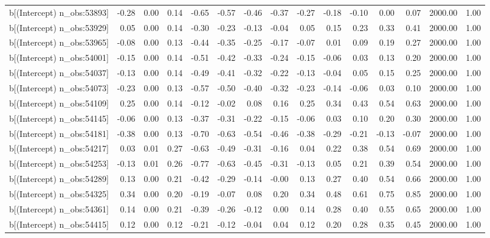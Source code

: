 \begin{table}[ht]
\begin{tabular}{rrrrrrrrrrrrrrr}
  b[(Intercept) n\_obs:53893] & -0.28 & 0.00 & 0.14 & -0.65 & -0.57 & -0.46 & -0.37 & -0.27 & -0.18 & -0.10 & 0.00 & 0.07 & 2000.00 & 1.00 \\ 
  b[(Intercept) n\_obs:53929] & 0.05 & 0.00 & 0.14 & -0.30 & -0.23 & -0.13 & -0.04 & 0.05 & 0.15 & 0.23 & 0.33 & 0.41 & 2000.00 & 1.00 \\ 
  b[(Intercept) n\_obs:53965] & -0.08 & 0.00 & 0.13 & -0.44 & -0.35 & -0.25 & -0.17 & -0.07 & 0.01 & 0.09 & 0.19 & 0.27 & 2000.00 & 1.00 \\ 
  b[(Intercept) n\_obs:54001] & -0.15 & 0.00 & 0.14 & -0.51 & -0.42 & -0.33 & -0.24 & -0.15 & -0.06 & 0.03 & 0.13 & 0.20 & 2000.00 & 1.00 \\ 
  b[(Intercept) n\_obs:54037] & -0.13 & 0.00 & 0.14 & -0.49 & -0.41 & -0.32 & -0.22 & -0.13 & -0.04 & 0.05 & 0.15 & 0.25 & 2000.00 & 1.00 \\ 
  b[(Intercept) n\_obs:54073] & -0.23 & 0.00 & 0.13 & -0.57 & -0.50 & -0.40 & -0.32 & -0.23 & -0.14 & -0.06 & 0.03 & 0.10 & 2000.00 & 1.00 \\ 
  b[(Intercept) n\_obs:54109] & 0.25 & 0.00 & 0.14 & -0.12 & -0.02 & 0.08 & 0.16 & 0.25 & 0.34 & 0.43 & 0.54 & 0.63 & 2000.00 & 1.00 \\ 
  b[(Intercept) n\_obs:54145] & -0.06 & 0.00 & 0.13 & -0.37 & -0.31 & -0.22 & -0.15 & -0.06 & 0.03 & 0.10 & 0.20 & 0.30 & 2000.00 & 1.00 \\ 
  b[(Intercept) n\_obs:54181] & -0.38 & 0.00 & 0.13 & -0.70 & -0.63 & -0.54 & -0.46 & -0.38 & -0.29 & -0.21 & -0.13 & -0.07 & 2000.00 & 1.00 \\ 
  b[(Intercept) n\_obs:54217] & 0.03 & 0.01 & 0.27 & -0.63 & -0.49 & -0.31 & -0.16 & 0.04 & 0.22 & 0.38 & 0.54 & 0.69 & 2000.00 & 1.00 \\ 
  b[(Intercept) n\_obs:54253] & -0.13 & 0.01 & 0.26 & -0.77 & -0.63 & -0.45 & -0.31 & -0.13 & 0.05 & 0.21 & 0.39 & 0.54 & 2000.00 & 1.00 \\ 
  b[(Intercept) n\_obs:54289] & 0.13 & 0.00 & 0.21 & -0.42 & -0.29 & -0.14 & -0.00 & 0.13 & 0.27 & 0.40 & 0.54 & 0.66 & 2000.00 & 1.00 \\ 
  b[(Intercept) n\_obs:54325] & 0.34 & 0.00 & 0.20 & -0.19 & -0.07 & 0.08 & 0.20 & 0.34 & 0.48 & 0.61 & 0.75 & 0.85 & 2000.00 & 1.00 \\ 
  b[(Intercept) n\_obs:54361] & 0.14 & 0.00 & 0.21 & -0.39 & -0.26 & -0.12 & 0.00 & 0.14 & 0.28 & 0.40 & 0.55 & 0.65 & 2000.00 & 1.00 \\ 
  b[(Intercept) n\_obs:54415] & 0.12 & 0.00 & 0.12 & -0.21 & -0.12 & -0.04 & 0.04 & 0.12 & 0.20 & 0.28 & 0.35 & 0.45 & 2000.00 & 1.00 \\ 

\end{tabular}
\end{table}
